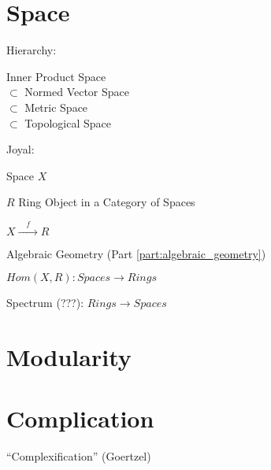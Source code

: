 \section{Space}\label{sec:space}

Hierarchy:

Inner Product Space \hfill \\
$\subset$ Normed Vector Space \hfill \\
$\subset$ Metric Space \hfill \\
$\subset$ Topological Space

Joyal: %

Space $X$

$R$ Ring Object in a Category of Spaces

$X \xrightarrow{\quad f \quad} R$

Algebraic Geometry (Part \ref{part:algebraic_geometry})

$Hom(X,R) : Spaces \rightarrow Rings$

Spectrum (???): $Rings \rightarrow Spaces$



\section{Modularity}\label{sec:modularity}

\section{Complication}\label{sec:complication}

``Complexification'' (Goertzel)
